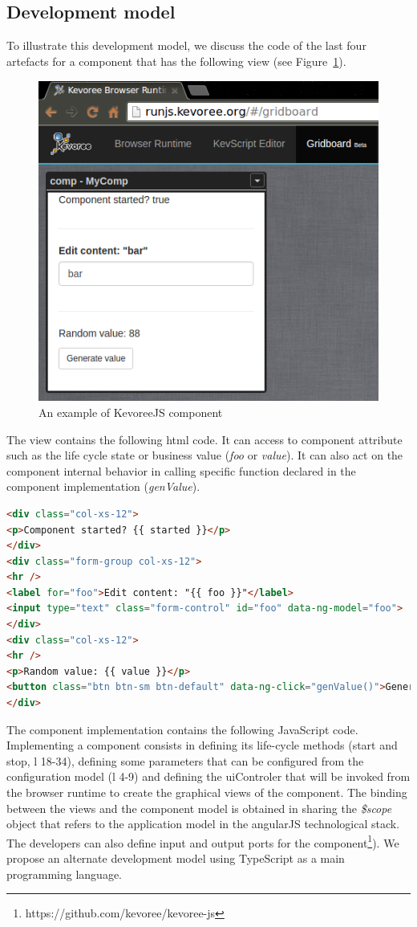 \subsection{Development model}
To illustrate this development model, we discuss the code of the last four artefacts for a component that has the following view (see Figure~\ref{fig:fig5}).


\begin{figure}[h]
	\centering
	\includegraphics[width=0.8\linewidth]{figures/fig5}
	\caption{An example of KevoreeJS component}
	\label{fig:fig5}
\end{figure}

The view contains the following html code. It can access to component attribute such as the life cycle state or business value (\emph{foo} or \emph{value}). It can also act on the component internal behavior in calling specific function declared in the component implementation (\emph{genValue}).

\begin{lstlisting}[language=HTML,numbers=right,firstnumber=last]
<div class="col-xs-12">
<p>Component started? {{ started }}</p>
</div>
<div class="form-group col-xs-12">
<hr />
<label for="foo">Edit content: "{{ foo }}"</label>
<input type="text" class="form-control" id="foo" data-ng-model="foo">
</div>
<div class="col-xs-12">
<hr />
<p>Random value: {{ value }}</p>
<button class="btn btn-sm btn-default" data-ng-click="genValue()">Generate value</button>
</div>
\end{lstlisting}


The component implementation contains the following JavaScript code. Implementing a component consists in defining its life-cycle methods (start and stop, l 18-34), defining some parameters that can be configured from the configuration model (l 4-9) and defining the uiControler that will be invoked from the browser runtime to create the graphical views of the component. The binding between the views and the component model is obtained in sharing the \emph{\$scope} object  that refers to the application model in the angularJS technological stack. The developers can also define input and output ports for the component\footnote{https://github.com/kevoree/kevoree-js}). We propose an alternate development model using TypeScript as a main programming language. 




